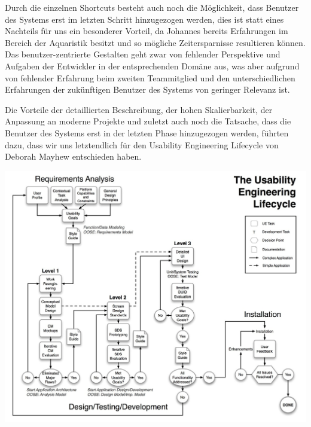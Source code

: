 Durch die einzelnen Shortcuts besteht auch noch die Möglichkeit, dass Benutzer des Systems erst im letzten Schritt hinzugezogen werden, dies ist statt eines Nachteils für uns ein besonderer Vorteil, da Johannes bereits Erfahrungen im Bereich der Aquaristik besitzt und so mögliche Zeitersparnisse resultieren können. Das benutzer-zentrierte Gestalten geht zwar von fehlender Perspektive und Aufgaben der Entwickler in der entsprechenden Domäne aus, was aber aufgrund von fehlender Erfahrung beim zweiten Teammitglied und den unterschiedlichen Erfahrungen der zukünftigen Benutzer des Systems von geringer Relevanz ist. 

Die Vorteile der detaillierten Beschreibung, der hohen Skalierbarkeit, der Anpassung an moderne Projekte und zuletzt auch noch die Tatsache, dass die Benutzer des Systems erst in der letzten Phase hinzugezogen werden, führten dazu, dass wir uns letztendlich für den Usability Engineering Lifecycle von Deborah Mayhew entschieden haben.

\includegraphics{ue_cycle}\label{ue_cycle}